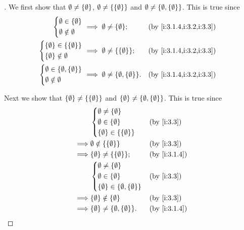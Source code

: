 \begin{proof}[]
  We first show that \(\emptyset \neq \left\lbrace\emptyset\right\rbrace\), \(\emptyset \neq \left\lbrace\left\lbrace\emptyset\right\rbrace\right\rbrace\) and \(\emptyset \neq \left\lbrace\emptyset, \left\lbrace\emptyset\right\rbrace\right\rbrace\).
  This is true since
  \begin{align*}
    \begin{dcases}
      \emptyset \in \set{\emptyset} \\
      \emptyset \notin \emptyset
    \end{dcases}                          & \implies \emptyset \neq \set{\emptyset};                  &  & \by{i:3.1.4,i:3.2,i:3.3} \\
    \begin{dcases}
      \set{\emptyset} \in \set{\set{\emptyset}} \\
      \set{\emptyset} \notin \emptyset
    \end{dcases}      & \implies \emptyset \neq \set{\set{\emptyset}};            &  & \by{i:3.1.4,i:3.2,i:3.3}                     \\
    \begin{dcases}
      \emptyset \in \set{\emptyset, \set{\emptyset}} \\
      \emptyset \notin \emptyset
    \end{dcases} & \implies \emptyset \neq \set{\emptyset, \set{\emptyset}}. &  & \by{i:3.1.4,i:3.2,i:3.3}
  \end{align*}

  Next we show that \(\left\lbrace\emptyset\right\rbrace \neq \left\lbrace\left\lbrace\emptyset\right\rbrace\right\rbrace\) and \(\left\lbrace\emptyset\right\rbrace \neq \left\lbrace\emptyset, \left\lbrace\emptyset\right\rbrace\right\rbrace\).
  This is true since
  \begin{align*}
             & \begin{dcases}
                 \emptyset \neq \set{\emptyset} \\
                 \emptyset \in \set{\emptyset}  \\
                 \set{\emptyset} \in \set{\set{\emptyset}}
               \end{dcases}            &  & \by{i:3.3}                               \\
    \implies & \emptyset \notin \set{\set{\emptyset}}                       &  & \by{i:3.3}   \\
    \implies & \set{\emptyset} \neq \set{\set{\emptyset}};                  &  & \by{i:3.1.4} \\
             & \begin{dcases}
                 \emptyset \neq \set{\emptyset} \\
                 \emptyset \in \set{\emptyset}  \\
                 \set{\emptyset} \in \set{\emptyset, \set{\emptyset}}
               \end{dcases} &  & \by{i:3.3}                    \\
    \implies & \set{\emptyset} \notin \set{\emptyset}                       &  & \by{i:3.3}   \\
    \implies & \set{\emptyset} \neq \set{\emptyset, \set{\emptyset}}.       &  & \by{i:3.1.4}
  \end{align*}


\end{proof}
